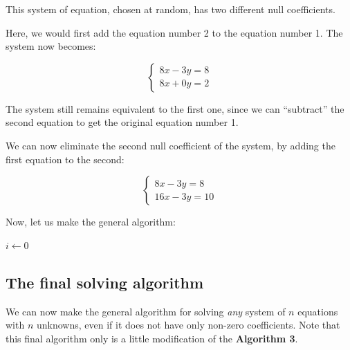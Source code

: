 \documentclass[11pt]{article}
\begin{document}
This system of equation, chosen at random, has two different null coefficients.

Here, we would first add the equation number 2 to the equation number 1.
The system now becomes:

\[
\begin{cases}
    8x - 3y = 8\\
    8x + 0y = 2
\end{cases}
\]

The system still remains equivalent to the first one, since we can ``subtract'' the second equation to get the original equation number 1.

We can now eliminate the second null coefficient of the system, by adding the first equation to the second:

\[
\begin{cases}
    8x - 3y = 8\\
    16x - 3y = 10
\end{cases}
\]

Now, let us make the general algorithm:

\begin{algorithm}
\caption{An algorithm to ensure a system of linear equations does not have null coefficients}

    $i \gets 0$\;
\end{algorithm}

\subsection{The final solving algorithm}

We can now make the general algorithm for solving \textit{any} system of $n$ equations with $n$ unknowns, even if it does not have only non-zero coefficients.
Note that this final algorithm only is a little modification of the \textbf{Algorithm 3}.
\end{document}
